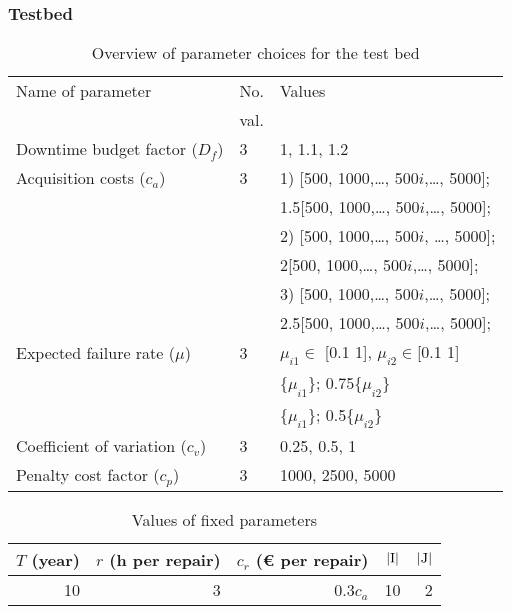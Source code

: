 \documentclass[preprint,12pt]{elsarticle}
\begin{document}
\subsubsection{Testbed}
\begin{table}[htbp]
  \centering
  \caption{Overview of parameter choices for the test bed}
    \begin{tabular}{lll}
    \toprule
    Name of parameter & No. & Values\\
                      &val. &         \\
    \midrule
    Downtime budget factor ($D_{f}$) & 3     & 1, 1.1, 1.2 \\
    Acquisition costs ($c_{a}$) & 3     & 1) [500, 1000,\dots, 500$i$,\dots, 5000];  \\
                                &       & 1.5[500, 1000,\dots, 500$i$,\dots, 5000];  \\
                                &       & 2) [500, 1000,\dots, 500$i$, \dots, 5000]; \\
                                &       & 2[500, 1000,\dots, 500$i$,\dots, 5000]; \\
                                &       & 3) [500, 1000,\dots, 500$i$,\dots, 5000]; \\
                                &       & 2.5[500, 1000,\dots, 500$i$,\dots, 5000]; \\
    Expected failure rate ($\mu$) & 3     & $\mu_{i1} \in$ [0.1 1], $\mu_{i2} \in$[0.1 1] \\
          &       & \{$\mu_{i1}$\}; 0.75\{$\mu_{i2}$\} \\
          &       & \{$\mu_{i1}$\}; 0.5\{$\mu_{i2}$\} \\
    Coefficient of variation ($c_{v}$) & 3     & 0.25, 0.5, 1 \\
    Penalty cost factor ($c_{p}$) & 3     & 1000, 2500, 5000 \\
    \bottomrule
    \end{tabular}%
  \label{tab:addlabel}%
\end{table}%

\begin{table}[htbp]
  \centering
  \caption{Values of fixed parameters}
    \begin{tabular}{rrrrr}
    \toprule
    $T$ (year) & $r$ (h per repair) & $c_{r}$ (€ per repair) & \(\lvert $I$ \rvert\)   & \(\lvert $J$\rvert\) \\
    \midrule
    10    & 3     & 0.3$c_{a}$ & 10    & 2 \\
    \bottomrule
    \end{tabular}%
  \label{tab:addlabel}%
\end{table}%
\end{document}
